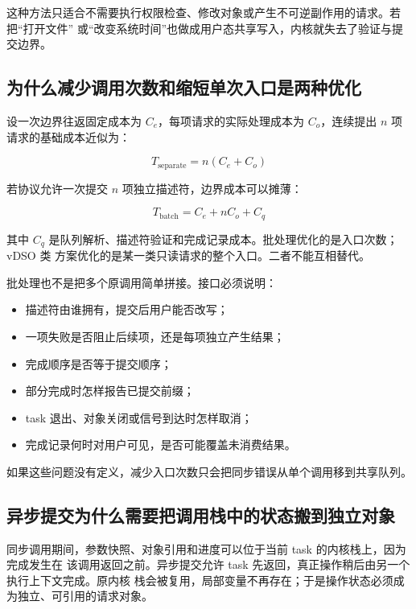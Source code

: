 这种方法只适合不需要执行权限检查、修改对象或产生不可逆副作用的请求。若把“打开文件”
或“改变系统时间”也做成用户态共享写入，内核就失去了验证与提交边界。

\subsection{为什么减少调用次数和缩短单次入口是两种优化}

设一次边界往返固定成本为 \(C_e\)，每项请求的实际处理成本为 \(C_o\)，连续提出 \(n\)
项请求的基础成本近似为：

\[
T_{\mathrm{separate}} = n(C_e + C_o)
\]

若协议允许一次提交 \(n\) 项独立描述符，边界成本可以摊薄：

\[
T_{\mathrm{batch}} = C_e + nC_o + C_q
\]

其中 \(C_q\) 是队列解析、描述符验证和完成记录成本。批处理优化的是入口次数；vDSO 类
方案优化的是某一类只读请求的整个入口。二者不能互相替代。

批处理也不是把多个原调用简单拼接。接口必须说明：

\begin{itemize}
\tightlist
\item 描述符由谁拥有，提交后用户能否改写；
\item 一项失败是否阻止后续项，还是每项独立产生结果；
\item 完成顺序是否等于提交顺序；
\item 部分完成时怎样报告已提交前缀；
\item task 退出、对象关闭或信号到达时怎样取消；
\item 完成记录何时对用户可见，是否可能覆盖未消费结果。
\end{itemize}

如果这些问题没有定义，减少入口次数只会把同步错误从单个调用移到共享队列。

\subsection{异步提交为什么需要把调用栈中的状态搬到独立对象}

同步调用期间，参数快照、对象引用和进度可以位于当前 task 的内核栈上，因为完成发生在
该调用返回之前。异步提交允许 task 先返回，真正操作稍后由另一个执行上下文完成。原内核
栈会被复用，局部变量不再存在；于是操作状态必须成为独立、可引用的请求对象。

